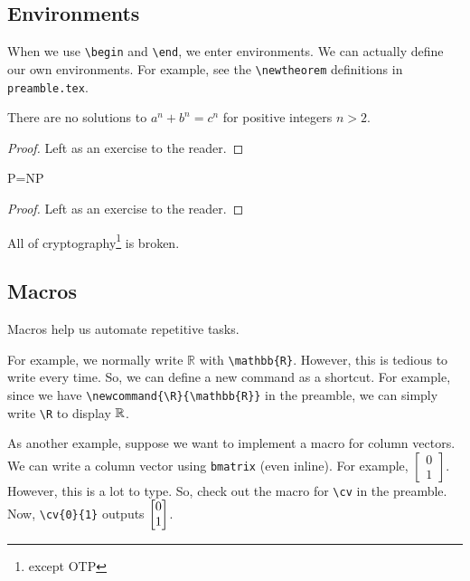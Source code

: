 \documentclass{article}
\begin{document}
\subsection{Environments}


When we use \texttt{\textbackslash begin} and \texttt{\textbackslash end}, we enter environments. We can actually define our own environments. For example, see the \texttt{\textbackslash newtheorem} definitions in \texttt{preamble.tex}.

\begin{theorem}
    There are no solutions to $a^n+b^n=c^n$ for positive integers $n > 2$.
\end{theorem}

\begin{proof}
    Left as an exercise to the reader.
\end{proof}

\begin{theorem}
    P=NP
\end{theorem}

\begin{proof}
    Left as an exercise to the reader.
\end{proof}

\begin{corollary}
    All of cryptography\footnote{except OTP} is broken.
\end{corollary}

\subsection{Macros}

Macros help us automate repetitive tasks.

For example, we normally write $\mathbb{R}$ with \texttt{\textbackslash mathbb\{R\}}. However, this is tedious to write every time. So, we can define a new command as a shortcut. For example, since we have \texttt{\textbackslash newcommand\{\textbackslash R\}\{\textbackslash mathbb\{R\}\}} in the preamble, we can simply write \texttt{\textbackslash R} to display $\mathbb{R}$.

As another example, suppose we want to implement a macro for column vectors. We can write a column vector using \texttt{bmatrix} (even inline). For example, $\begin{bmatrix}0\\1\end{bmatrix}$. However, this is a lot to type. So, check out the macro for \texttt{\textbackslash cv} in the preamble. Now, \texttt{\textbackslash cv\{0\}\{1\}} outputs $\begin{bmatrix}0\\1\end{bmatrix}$.
\end{document}
